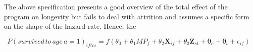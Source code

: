 The above specification presents a good overview of the total effect of the program on longevity but fails to deal with attrition and assumes a specific form on the shape of the hazard rate. Hence, the 

$$
P(survived\,to\,age\,a=1)_{iftcs} = f(\theta_0 + \theta_1MP_f + \theta_2\mathbf{X}_{if} + \theta_3\mathbf{Z}_{st} + \mathbf{\theta}_c + \mathbf{\theta}_t + \epsilon_{if})
$$